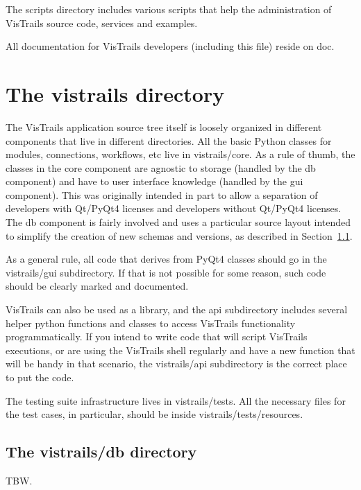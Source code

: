 \documentclass{article}
\begin{document}
The scripts directory includes various scripts that help the
administration of VisTrails source code, services and examples. 

All documentation for VisTrails developers (including this file)
reside on doc.

\section{The vistrails directory}

The VisTrails application source tree itself is loosely organized in
different components that live in different directories. All the basic
Python classes for modules, connections, workflows, etc live in
vistrails/core. As a rule of thumb, the classes in the core component
are agnostic to storage (handled by the db component) and have to user
interface knowledge (handled by the gui component). This was
originally intended in part to allow a separation of developers with
Qt/PyQt4 licenses and developers without Qt/PyQt4 licenses.  The db
component is fairly involved and uses a particular source layout
intended to simplify the creation of new schemas and versions, as
described in Section~\ref{sec:db}.

As a general rule, all code that derives from PyQt4 classes should go
in the vistrails/gui subdirectory. If that is not possible for some
reason, such code should be clearly marked and documented.

VisTrails can also be used as a library, and the api subdirectory
includes several helper python functions and classes to access
VisTrails functionality programmatically. If you intend to write code
that will script VisTrails executions, or are using the VisTrails
shell regularly and have a new function that will be handy in that
scenario, the vistrails/api subdirectory is the correct place to put
the code.

The testing suite infrastructure lives in vistrails/tests. All the
necessary files for the test cases, in particular, should be inside
vistrails/tests/resources.

\subsection{The vistrails/db directory}\label{sec:db}

TBW.
\end{document}
